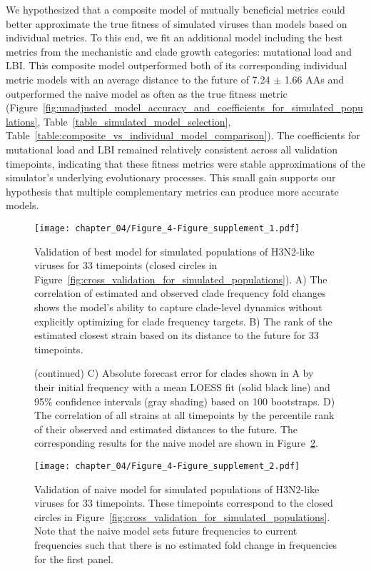 We hypothesized that a composite model of mutually beneficial metrics could better approximate the true fitness of simulated viruses than models based on individual metrics.
To this end, we fit an additional model including the best metrics from the mechanistic and clade growth categories: mutational load and LBI.
This composite model outperformed both of its corresponding individual metric models with an average distance to the future of 7.24 $\pm$ 1.66 AAs and outperformed the naive model as often as the true fitness metric (Figure~\ref{fig:unadjusted_model_accuracy_and_coefficients_for_simulated_populations}, Table~\ref{table_simulated_model_selection}, Table~\ref{table:composite_vs_individual_model_comparison}).
The coefficients for mutational load and LBI remained relatively consistent across all validation timepoints, indicating that these fitness metrics were stable approximations of the simulator's underlying evolutionary processes.
This small gain supports our hypothesis that multiple complementary metrics can produce more accurate models.

\begin{figure}
  \texttt{[image: chapter\_04/Figure\_4-Figure\_supplement\_1.pdf]}
  \caption{
    Validation of best model for simulated populations of H3N2-like viruses for 33 timepoints (closed circles in Figure~\ref{fig:cross_validation_for_simulated_populations}).
    A) The correlation of estimated and observed clade frequency fold changes shows the model's ability to capture clade-level dynamics without explicitly optimizing for clade frequency targets.
    B) The rank of the estimated closest strain based on its distance to the future for 33 timepoints.
  }
  \label{fig:validation_of_best_model_for_simulated_populations}
\end{figure}

\begin{figure}\ContinuedFloat
  \caption{(continued)
    C) Absolute forecast error for clades shown in A by their initial frequency with a mean LOESS fit (solid black line) and 95\% confidence intervals (gray shading) based on 100 bootstraps.
    D) The correlation of all strains at all timepoints by the percentile rank of their observed and estimated distances to the future.
    The corresponding results for the naive model are shown in Figure~\ref{fig:validation_of_naive_model_for_simulated_populations}.
  }
\end{figure}

\begin{figure}
  \texttt{[image: chapter\_04/Figure\_4-Figure\_supplement\_2.pdf]}
  \caption{
    Validation of naive model for simulated populations of H3N2-like viruses for 33 timepoints.
    These timepoints correspond to the closed circles in Figure~\ref{fig:cross_validation_for_simulated_populations}.
    Note that the naive model sets future frequencies to current frequencies such that there is no estimated fold change in frequencies for the first panel.
  }
  \label{fig:validation_of_naive_model_for_simulated_populations}
\end{figure}


